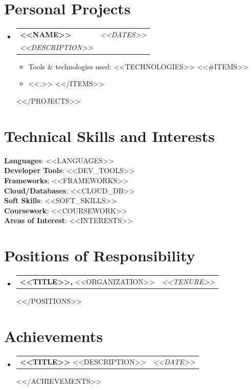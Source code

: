\documentclass[a4paper,11pt]{article}
\makeatletter
\newcommand{\resumePOR}[3]{
\vspace{0.5mm}\item
    \begin{tabular*}{0.97\textwidth}[t]{l@{\extracolsep{\fill}}r}
        \textbf{#1}\hspace{0.3mm}#2 & \textit{\small{#3}} 
    \end{tabular*}
    \vspace{-2mm}
}
\newcommand{\resumeProject}[4]{
\vspace{0.5mm}\item
    \begin{tabular*}{0.98\textwidth}[t]{l@{\extracolsep{\fill}}r}
        \textbf{#1} & \textit{\footnotesize{#3}} \\
        \footnotesize{\textit{#2}} & \footnotesize{#4}
    \end{tabular*}
    \vspace{-2.4mm}
}
\newcommand{\resumeSubHeadingListStart}{\begin{itemize}[leftmargin=*,labelsep=0mm]}
\newcommand{\resumeItemListStart}{\begin{justify}\begin{itemize}[leftmargin=3ex, rightmargin=2ex, noitemsep,labelsep=1.2mm,itemsep=0mm]\small}
\newcommand{\resumeSubHeadingListEnd}{\end{itemize}\vspace{2mm}}
\newcommand{\resumeItemListEnd}{\end{itemize}\end{justify}\vspace{-2mm}}
\makeatother
\begin{document}
\section{\textbf{Personal Projects}}
\resumeSubHeadingListStart
    <<#PROJECTS>>
    \resumeProject
      {<<NAME>>}
      {<<DESCRIPTION>>}
      {<<DATES>>}
      {}
      \resumeItemListStart
        \item {Tools \& technologies used: <<TECHNOLOGIES>>}
        <<#ITEMS>>
        \item <<.>>
        <</ITEMS>>
    \resumeItemListEnd
    \vspace{-2mm}
    <</PROJECTS>>
  \resumeSubHeadingListEnd
\vspace{-5.5mm}



\section{\textbf{Technical Skills and Interests}}
 \begin{itemize}[leftmargin=0.05in, label={}]
    \small{\item{
     \textbf{Languages}{: <<LANGUAGES>>} \\
     \textbf{Developer Tools}{: <<DEV_TOOLS>>} \\
     \textbf{Frameworks}{: <<FRAMEWORKS>>} \\
     \textbf{Cloud/Databases}{: <<CLOUD_DB>>} \\
     \textbf{Soft Skills}{: <<SOFT_SKILLS>>} \\
     \textbf{Coursework}{: <<COURSEWORK>>} \\
     \textbf{Areas of Interest}{: <<INTERESTS>>} \\
    }}
 \end{itemize}
 \vspace{-16pt}



\section{\textbf{Positions of Responsibility}}
\vspace{-0.4mm}
\resumeSubHeadingListStart
<<#POSITIONS>>
\resumePOR{<<TITLE>>, }
    {<<ORGANIZATION>>}
    {<<TENURE>>}
<</POSITIONS>>
\resumeSubHeadingListEnd
\vspace{-5mm}




\section{\textbf{Achievements}}
\vspace{-0.4mm}
\resumeSubHeadingListStart
<<#ACHIEVEMENTS>>
\resumePOR{<<TITLE>> }
    {<<DESCRIPTION>>}
    {<<DATE>>}
<</ACHIEVEMENTS>>
\resumeSubHeadingListEnd
\vspace{-5mm}



\end{document}
